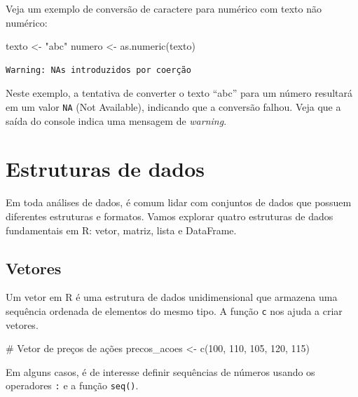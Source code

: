 \documentclass[
  portuguese,
  letterpaper,
  DIV=11,
  numbers=noendperiod]{scrreprt}
\newenvironment{Shaded}{\begin{snugshade}}{\end{snugshade}}
\newcommand{\CommentTok}[1]{\textcolor[rgb]{0.37,0.37,0.37}{#1}}
\newcommand{\DecValTok}[1]{\textcolor[rgb]{0.68,0.00,0.00}{#1}}
\newcommand{\FunctionTok}[1]{\textcolor[rgb]{0.28,0.35,0.67}{#1}}
\newcommand{\NormalTok}[1]{\textcolor[rgb]{0.00,0.23,0.31}{#1}}
\newcommand{\OtherTok}[1]{\textcolor[rgb]{0.00,0.23,0.31}{#1}}
\newcommand{\StringTok}[1]{\textcolor[rgb]{0.13,0.47,0.30}{#1}}
\theoremstyle{definition}
\theoremstyle{remark}
\begin{document}
Veja um exemplo de conversão de caractere para numérico com texto não
numérico:

\begin{Shaded}
\begin{Highlighting}[]
\NormalTok{texto }\OtherTok{\textless{}{-}} \StringTok{"abc"}
\NormalTok{numero }\OtherTok{\textless{}{-}} \FunctionTok{as.numeric}\NormalTok{(texto)}
\end{Highlighting}
\end{Shaded}

\begin{verbatim}
Warning: NAs introduzidos por coerção
\end{verbatim}

Neste exemplo, a tentativa de converter o texto ``abc'' para um número
resultará em um valor \texttt{NA} (Not Available), indicando que a
conversão falhou. Veja que a saída do console indica uma mensagem de
\emph{warning}.

\section{Estruturas de dados}\label{estruturas-de-dados}

Em toda análises de dados, é comum lidar com conjuntos de dados que
possuem diferentes estruturas e formatos. Vamos explorar quatro
estruturas de dados fundamentais em R: vetor, matriz, lista e DataFrame.

\subsection{Vetores}\label{vetores}

Um vetor em R é uma estrutura de dados unidimensional que armazena uma
sequência ordenada de elementos do mesmo tipo. A função \texttt{c} nos
ajuda a criar vetores.

\begin{Shaded}
\begin{Highlighting}[]
\CommentTok{\# Vetor de preços de ações}
\NormalTok{precos\_acoes }\OtherTok{\textless{}{-}} \FunctionTok{c}\NormalTok{(}\DecValTok{100}\NormalTok{, }\DecValTok{110}\NormalTok{, }\DecValTok{105}\NormalTok{, }\DecValTok{120}\NormalTok{, }\DecValTok{115}\NormalTok{)}
\end{Highlighting}
\end{Shaded}

Em alguns casos, é de interesse definir sequências de números usando os
operadores \texttt{:} e a função \texttt{seq()}.
\end{document}
